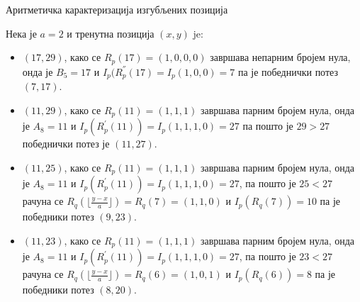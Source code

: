 \documentclass[10pt]{beamer}
\begin{document}
%		
	
	
		\begin{frame}{Аритметичка карактеризација изгубљених позиција}
		
		Нека је $ a = 2 $ и тренутна позиција $ (x, y) $ je:
		\begin{itemize}
			\item $ (17,29) $, како се $ R_{p}(17) = (1, 0, 0, 0)$ завршава непарним бројем нула, онда је $ B_{5} = 17 $ и $ I_{p}(R^{''}_{p}(17) = I_{p}(1, 0, 0) = 7 $ па је победнички потез $ (7, 17) $.
			\item $ (11, 29) $, како се $ R_{p}(11) = (1, 1, 1) $ завршава парним бројем нула, онда је $ A_{8} = 11 $ и $ I_{p}(R^{'}_{p}(11)) = I_{p}(1, 1, 1, 0) = 27 $ па пошто је $ 29 > 27 $ победнички потез је $ (11, 27) $.
			\item $ (11, 25) $, како се $ R_{p}(11) = (1, 1, 1) $ завршава парним бројем нула, онда је $ A_{8} = 11 $ и $ I_{p}(R^{'}_{p}(11)) = I_{p}(1, 1, 1, 0) = 27 $, па пошто је $ 25 < 27 $ рачуна се $ R_{q}(\lfloor \frac{y - x}{a} \rfloor) = R_{q}(7) = (1, 1, 0) $ и $ I_{p}(R_{q}(7)) = 10 $ па је победники потез $ (9, 23) $.
			\item $ (11, 23) $, како се $ R_{p}(11) = (1, 1, 1) $ завршава парним бројем нула, онда је $ A_{8} = 11 $ и $ I_{p}(R^{'}_{p}(11)) = I_{p}(1, 1, 1, 0) = 27 $, па пошто је $ 23 < 27 $ рачуна се $ R_{q}(\lfloor \frac{y - x}{a} \rfloor) = R_{q}(6) = (1, 0, 1) $ и $ I_{p}(R_{q}(6)) = 8 $ па је победники потез $ (8, 20) $.
		\end{itemize}		
	\end{frame}
	
\end{document}
